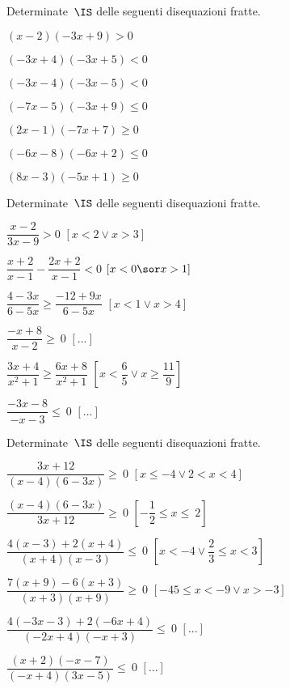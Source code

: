 \begin{esercizio}[]
\label{ese:dis_}
Determinate~\(\IS\) delle seguenti disequazioni fratte.
\begin{multicols}{2}
\begin{enumeratea}
\spazielenx
\item \((x-2)(-3x+9)>0\)
\item \((-3x+4)(-3x+5)<0\)
\item \((-3x-4)(-3x-5)<0\)
\item \((-7x-5)(-3x+9)\le0\)
\item \((2x-1)(-7x+7)\ge0\)
\item \((-6x-8)(-6x+2)\le0\)
\item \((8x-3)(-5x+1)\ge0\)
\end{enumeratea}
\end{multicols}
\end{esercizio}

\begin{esercizio}[]
\label{ese:21.55}
Determinate~\(\IS\) delle seguenti disequazioni fratte.
\begin{multicols}{2}
\begin{enumeratea}
\spazielenx
\item \(\dfrac{x-2}{3x-9}>0\) \hfill \(\left[x<2\vee x>3\right]\)
\item \(\dfrac{x+2}{x-1}-\dfrac{2x+2}{x-1} < 0\) 
\hfill \(\left[x< 0 \sor x>1\right]\)
\item \(\dfrac{4-3x}{6-5x}\geqslant \dfrac{-12+9x}{6-5x}\) 
\hfill \(\left[x<1\vee x>4\right]\)
\item \(\dfrac{-x+8}{x-2}\ge~0\) \hfill \(\left[...\right]\)
\item \(\dfrac{3x+4}{x^{2}+1}\ge\dfrac{6x+8}{x^{2}+1}\) 
 \hfill \(\left[x<\dfrac{6}{5}\vee x\ge\dfrac{11}{9}\right]\)
\item \(\dfrac{-3x-8}{-x-3}\le~0\) \hfill \(\left[...\right]\)
\end{enumeratea}
\end{multicols}
\end{esercizio}

\begin{esercizio}[]
\label{ese:21.55}
Determinate~\(\IS\) delle seguenti disequazioni fratte.
\begin{enumeratea}
\spazielenx
\item \(\dfrac{3x+12}{(x-4)(6-3x)}\geqslant~0\)
 \hfill \(\left[x\le -4 \vee 2<x<4\right]\)
\item \(\dfrac{(x-4)(6-3x)}{3x+12}\geqslant~0\)
 \hfill \(\left[-{\dfrac{1}{2}}\le x\le~2\right]\)
\item \(\dfrac{4(x-3)+2(x+4)}{(x+4)(x-3)}\leqslant~0\)
 \hfill \(\left[x<-4\vee\dfrac{2}{3}\le x<3\right]\)
\item \(\dfrac{7(x+9)-6(x+3)}{(x+3)(x+9)}\geqslant~0\)
 \hfill \(\left[-45\le x<-9\vee x>-3\right]\)
\item \(\dfrac{4(-3x-3)+2(-6x+4)}{(-2x+4)(-x+3)}\leqslant~0\)
 \hfill \(\left[...\right]\)
\item \(\dfrac{(x+2)(-x-7)}{(-x+4)(3x-5)}\leqslant~0\)
 \hfill \(\left[...\right]\)
\end{enumeratea}
\end{esercizio}

